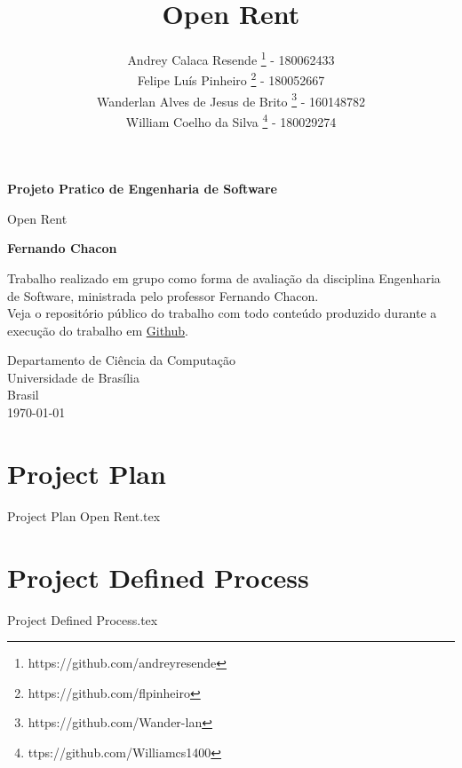 \documentclass[a4paper,11pt]{book}
\title{Open Rent}
\author{
    Andrey Calaca Resende \footnote{https://github.com/andreyresende} - 180062433\\
    Felipe Luís Pinheiro \footnote{https://github.com/flpinheiro} - 180052667 \\
    Wanderlan Alves de Jesus de Brito \footnote{https://github.com/Wander-lan} - 160148782\\
    William Coelho da Silva \footnote{ttps://github.com/Williamcs1400} - 180029274

}
\date{}
\begin{document}
\begin{titlepage}
    \begin{center}
        \vspace*{1cm}
 
        \textbf{Projeto Pratico de Engenharia de Software}
 
        \vspace{0.5cm}
         Open Rent
             
        \vspace{1.5cm}
 
        \textbf{Fernando Chacon}
 
        \vfill
             
        Trabalho realizado em grupo como forma de avaliação da disciplina Engenharia de Software, ministrada pelo professor Fernando Chacon.\\
        Veja o repositório público do trabalho com todo conteúdo produzido durante a execução do trabalho em \href{https://github.com/flpinheiro/ProjetoES}{Github}.
             
        \vspace{0.8cm}
      
             
        Departamento de Ciência da Computação\\
        Universidade de Brasília\\
        Brasil\\
        \today
             
    \end{center}
 \end{titlepage}

\maketitle

\tableofcontents

\chapter{Project Plan}
{Project Plan Open Rent.tex}

\chapter{Project Defined Process}
{Project Defined Process.tex}
\end{document}
